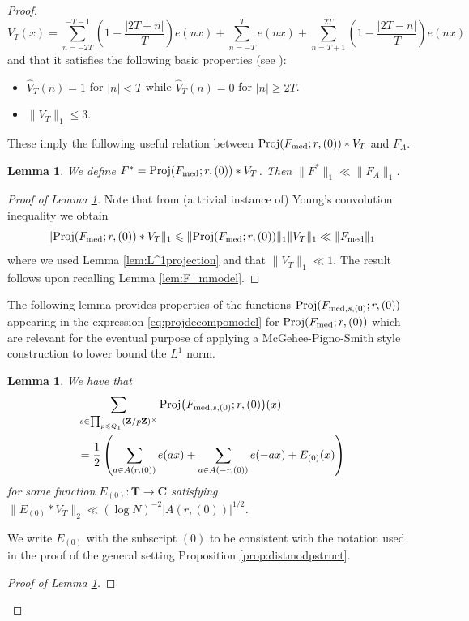 \documentclass[11pt, reqno]{amsart}
\newtheorem{lemma}[theorem]{Lemma}
\DeclareMathOperator{\Proj}{Proj}
\begin{document}
\begin{proof}
$$V_{T}(x)=\sum_{n=-2T}^{-T-1}\left(1-\frac{|2T+n|}{T}\right)e(nx)+\sum_{n=-T}^Te(nx)+\sum_{n=T+1}^{2T}\left(1-\frac{|2T-n|}{T}\right)e(nx)$$  and that it satisfies the following basic properties (see \cite[Chapter VIII, (205)]{natanson}):
\begin{itemize}
    \item $\hat{V}_{T}(n)=1$ for $|n|<T$ while $\hat{V}_{T}(n)=0$ for $|n|\geqslant 2T$. 
    \item $\lVert V_{T}\rVert_1 \leqslant 3$.
\end{itemize}
These imply the following useful relation between $\Proj(F_\textnormal{med};r,(0))*V_{T}$ and $F_A$.
\begin{lemma}\label{lem:dlVPconvmodel}
    We define $F^*=\Proj(F_\textnormal{med};r,(0))*V_{T}$. Then $\lVert F^*\rVert_1\ll \lVert F_A\rVert_1$.
\end{lemma}
\begin{proof}[Proof of Lemma \ref{lem:dlVPconvmodel}]
    Note that from (a trivial instance of) Young's convolution inequality we obtain
    $$\lVert \Proj(F_\textnormal{med};r,(0))*V_{T}\rVert_1\leqslant \lVert \Proj(F_\textnormal{med};r,(0))\rVert_1\lVert V_{T}\rVert_1\ll \lVert F_\textnormal{med}\rVert_1$$
    where we used Lemma \ref{lem:L^1projection} and that $\lVert V_{T}\rVert _1\ll 1$. The result follows upon recalling Lemma \ref{lem:F_mmodel}.
\end{proof}
The following lemma provides properties of the functions $\Proj(F_{\textnormal{med},s,(0)};r,(0))$ appearing in the expression \eqref{eq:projdecompomodel} for $\Proj(F_\textnormal{med};r,(0))$ which are relevant for the eventual purpose of applying a McGehee-Pigno-Smith style construction to lower bound the $L^1$ norm.
\begin{lemma}\label{lem:allscontmodel}
    We have that
    \begin{align*}   &\sum_{s\in \prod_{p\leqslant Q_1}(\mathbf{Z}/p\mathbf{Z})^\times}\Proj\bigl(F_{\textnormal{med},s,(0)};r,(0)\bigr)(x)\\
    &=\frac{1}{2}\left(\sum_{a\in A(r,(0))}e(ax) + \sum_{a\in A(-r,(0))}e(-ax) + E_{(0)}(x)\right)
    \end{align*}
        for some function $E_{(0)}:\mathbf{T}\to\mathbf{C}$ satisfying $\lVert E_{(0)}*V_{T}\rVert_2\ll (\log N)^{-2}|A(r,(0))|^{1/2}$.
\end{lemma}
We write $E_{(0)}$ with the subscript $(0)$ to be consistent with the notation used in the proof of the general setting Proposition \ref{prop:distmodpstruct}.
\begin{proof}[Proof of Lemma \ref{lem:allscontmodel}]

\end{proof}
\end{proof}
\end{document}
